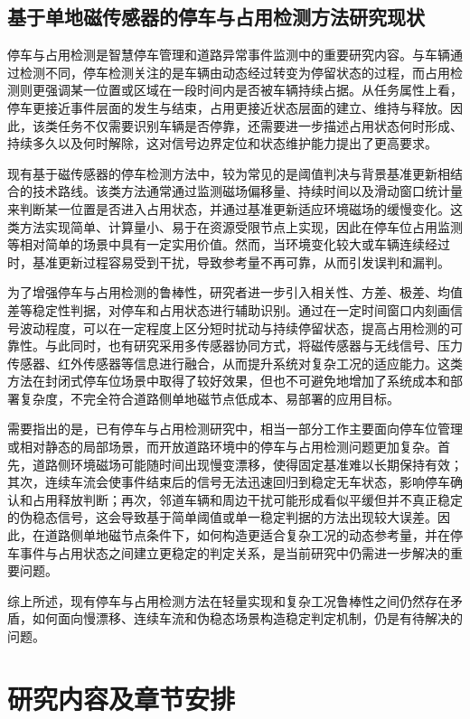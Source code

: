 \subsection{基于单地磁传感器的停车与占用检测方法研究现状}
\label{sec:related_parking_detection}

停车与占用检测是智慧停车管理和道路异常事件监测中的重要研究内容。与车辆通过检测不同，停车检测关注的是车辆由动态经过转变为停留状态的过程，而占用检测则更强调某一位置或区域在一段时间内是否被车辆持续占据。从任务属性上看，停车更接近事件层面的发生与结束，占用更接近状态层面的建立、维持与释放。因此，该类任务不仅需要识别车辆是否停靠，还需要进一步描述占用状态何时形成、持续多久以及何时解除，这对信号边界定位和状态维护能力提出了更高要求。

现有基于磁传感器的停车检测方法中，较为常见的是阈值判决与背景基准更新相结合的技术路线。该类方法通常通过监测磁场偏移量、持续时间以及滑动窗口统计量来判断某一位置是否进入占用状态，并通过基准更新适应环境磁场的缓慢变化。这类方法实现简单、计算量小、易于在资源受限节点上实现，因此在停车位占用监测等相对简单的场景中具有一定实用价值。然而，当环境变化较大或车辆连续经过时，基准更新过程容易受到干扰，导致参考量不再可靠，从而引发误判和漏判。

为了增强停车与占用检测的鲁棒性，研究者进一步引入相关性、方差、极差、均值差等稳定性判据，对停车和占用状态进行辅助识别。通过在一定时间窗口内刻画信号波动程度，可以在一定程度上区分短时扰动与持续停留状态，提高占用检测的可靠性。与此同时，也有研究采用多传感器协同方式，将磁传感器与无线信号、压力传感器、红外传感器等信息进行融合，从而提升系统对复杂工况的适应能力。这类方法在封闭式停车位场景中取得了较好效果，但也不可避免地增加了系统成本和部署复杂度，不完全符合道路侧单地磁节点低成本、易部署的应用目标。

需要指出的是，已有停车与占用检测研究中，相当一部分工作主要面向停车位管理或相对静态的局部场景，而开放道路环境中的停车与占用检测问题更加复杂。首先，道路侧环境磁场可能随时间出现慢变漂移，使得固定基准难以长期保持有效；其次，连续车流会使事件结束后的信号无法迅速回归到稳定无车状态，影响停车确认和占用释放判断；再次，邻道车辆和周边干扰可能形成看似平缓但并不真正稳定的伪稳态信号，这会导致基于简单阈值或单一稳定判据的方法出现较大误差。因此，在道路侧单地磁节点条件下，如何构造更适合复杂工况的动态参考量，并在停车事件与占用状态之间建立更稳定的判定关系，是当前研究中仍需进一步解决的重要问题。

综上所述，现有停车与占用检测方法在轻量实现和复杂工况鲁棒性之间仍然存在矛盾，如何面向慢漂移、连续车流和伪稳态场景构造稳定判定机制，仍是有待解决的问题。


\section{研究内容及章节安排}
\label{sec:intro_content}

